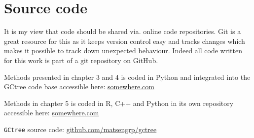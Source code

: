 \chapter{Source code}
It is my view that code should be shared via. online code repositories.
Git is a great resource for this as it keeps version control easy and tracks changes which makes it possible to track down unexpected behaviour.
Indeed all code written for this work is part of a git repository on GitHub.

Methods presented in chapter 3 and 4 is coded in Python and integrated into the GCtree code base accessible here:
\url{somewhere.com}

Methods in chapter 5 is coded in R, C++ and Python in its own repository accessible here:
\url{somewhere.com}








\texttt{GCtree} source code:
\url{github.com/matsengrp/gctree}

